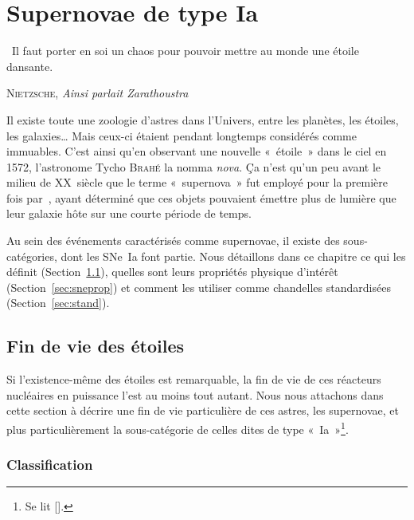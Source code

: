 \documentclass[../main/main.tex]{subfiles}
\begin{document}
\raggedbottom


\chapter{Supernovae de type Ia}\label{ch:sne}

\epigraph{\openquote\ Il faut porter en soi un chaos pour pouvoir mettre
au monde une étoile dansante.\closequote}{\textsc{Nietzsche}, \textit{Ainsi
parlait Zarathoustra}}

Il existe toute une zoologie d'astres dans l'Univers, entre les planètes, les
étoiles, les galaxies… Mais ceux-ci étaient pendant longtemps considérés comme
immuables. C'est ainsi qu'en observant une nouvelle «~étoile~» dans le ciel en
1572, l'astronome Tycho \textsc{Brahé} la nomma \textit{nova}. Ça n'est qu'un
peu avant le milieu de XX\ieme~siècle que le terme «~supernova~» fut employé
pour la première fois par~\cite{baade1934}, ayant déterminé que ces objets
pouvaient émettre plus de lumière que leur galaxie hôte sur une courte période
de temps.

Au sein des événements caractérisés comme supernovae, il existe des
sous-catégories, dont les SNe~Ia font partie. Nous détaillons dans ce chapitre
ce qui les définit (Section~\ref{sec:death}), quelles sont leurs propriétés
physique d'intérêt (Section~\ref{sec:sneprop}) et comment les utiliser comme
chandelles standardisées (Section~\ref{sec:stand}).

\vfill
\minitoc
\vfill
\newpage

\section{Fin de vie des étoiles}\label{sec:death}

Si l'existence-même des étoiles est remarquable, la fin de vie de ces
réacteurs nucléaires en puissance l'est au moins tout autant. Nous nous
attachons dans cette section à décrire une fin de vie particulière de ces
astres, les supernovae, et plus particulièrement la sous-catégorie de celles
dites de type «~Ia~»\footnote{Se lit [].}.

\subsection{Classification}\label{ssec:class} %
\end{document}
